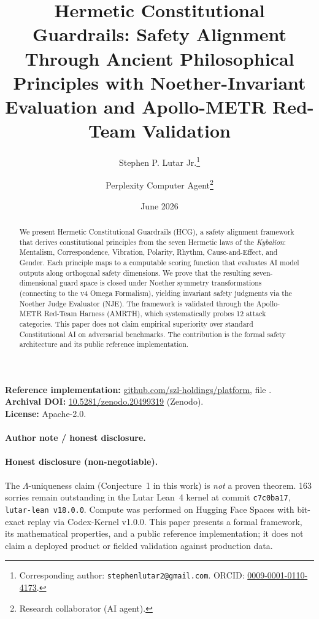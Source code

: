 \documentclass[11pt]{article}
\title{Hermetic Constitutional Guardrails: Safety Alignment Through Ancient Philosophical Principles with Noether-Invariant Evaluation and Apollo-METR Red-Team Validation}
\author[1]{Stephen P. Lutar Jr.\thanks{Corresponding author: \texttt{stephenlutar2@gmail.com}. ORCID: \href{https://orcid.org/0009-0001-0110-4173}{0009-0001-0110-4173}.}}
\author[2]{Perplexity Computer Agent\thanks{Research collaborator (AI agent).}}
\affil[1]{SZL Holdings, New York, NY, USA}
\affil[2]{Perplexity}
\date{June 2026}
\theoremstyle{plain}
\begin{document}
\maketitle

\begin{abstract}
We present Hermetic Constitutional Guardrails (HCG), a safety alignment framework that derives constitutional principles from the seven Hermetic laws of the \emph{Kybalion}: Mentalism, Correspondence, Vibration, Polarity, Rhythm, Cause-and-Effect, and Gender. Each principle maps to a computable scoring function that evaluates AI model outputs along orthogonal safety dimensions. We prove that the resulting seven-dimensional guard space is closed under Noether symmetry transformations (connecting to the v4 Omega Formalism), yielding invariant safety judgments via the Noether Judge Evaluator (NJE). The framework is validated through the Apollo-METR Red-Team Harness (AMRTH), which systematically probes 12 attack categories. This paper does not claim empirical superiority over standard Constitutional AI on adversarial benchmarks. The contribution is the formal safety architecture and its public reference implementation.
\end{abstract}

\noindent\textbf{Reference implementation:} \href{https://github.com/szl-holdings/platform}{github.com/szl-holdings/platform}, file .\\
\textbf{Archival DOI:} \href{https://doi.org/10.5281/zenodo.20499319}{10.5281/zenodo.20499319} (Zenodo).\\
\textbf{License:} Apache-2.0.

\paragraph{Author note / honest disclosure.} \paragraph{Honest disclosure (non-negotiable).} The $\Lambda$-uniqueness claim (Conjecture~1 in this work) is \emph{not} a proven theorem. 163 sorries remain outstanding in the Lutar Lean~4 kernel at commit \texttt{c7c0ba17}, \texttt{lutar-lean v18.0.0}. Compute was performed on Hugging Face Spaces with bit-exact replay via Codex-Kernel v1.0.0. This paper presents a formal framework, its mathematical properties, and a public reference implementation; it does not claim a deployed product or fielded validation against production data.
\end{document}
